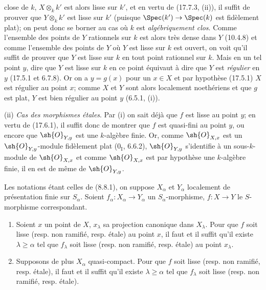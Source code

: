 
close de $k$, $X\otimes_k k'$ est alors lisse sur $k'$, et en vertu de (17.7.3, (ii)), il suffit de prouver que $Y\otimes_k k'$ est lisse sur $k'$ (puisque $\Spec(k')\to\Spec(k)$ est fidèlement plat); on peut donc se borner au cas où $k$ est \emph{algébriquement clos}. Comme l'ensemble des points de $Y$ rationnels sur $k$ est alors très dense dans $Y$ (10.4.8) et comme l'ensemble des points de $Y$ où $Y$ est lisse sur $k$ est ouvert, on voit qu'il suffit de prouver que $Y$ est lisse sur $k$ en tout point rationnel sur $k$. Mais en un tel point $y$, dire que $Y$ est lisse sur $k$ en ce point équivaut à dire que $Y$ est \emph{régulier} en $y$ (17.5.1 et 6.7.8). Or on a $y=g(x)$ pour un $x\in X$ et par hypothèse (17.5.1) $X$ est régulier au point $x$; comme $X$ et $Y$ sont alors localement noethériens et que $g$ est plat, $Y$ est bien régulier au point $y$ (6.5.1, (i)).

(ii) \emph{Cas des morphismes étales}. Par (i) on sait déjà que $f$ est lisse au point $y$; en vertu de (17.6.1), il suffit donc de montrer que $f$ est quasi-fini au point $y$, ou encore que $\sh{O}_{Y,y}$ est une $k$-algèbre finie. Or, comme $\sh{O}_{X,x}$ est un $\sh{O}_{Y,y}$-module fidèlement plat ($0_{\mathrm I}$, 6.6.2), $\sh{O}_{Y,y}$ s'identifie à un sous-$k$-module de $\sh{O}_{X,x}$ et comme $\sh{O}_{X,x}$ est par hypothèse une $k$-algèbre finie, il en est de même de $\sh{O}_{Y,y}$.

\begin{proposition}[17.7.8]
\label{IV.17.7.8}
Les notations étant celles de (8.8.1), on suppose $X_\alpha$ et $Y_\alpha$ localement de présentation finie sur $S_\alpha$. Soient $f_\alpha:X_\alpha\to Y_\alpha$ un $S_\alpha$-morphisme, $f:X\to Y$ le $S$-morphisme correspondant.
\begin{enumerate}
  \item[(i)] Soient $x$ un point de $X$, $x_\lambda$ sa projection canonique dans $X_\lambda$. Pour que $f$ soit lisse (resp. non ramifié, resp. étale) au point $x$, il faut et il suffit qu'il existe $\lambda\geq\alpha$ tel que $f_\lambda$ soit lisse (resp. non ramifié, resp. étale) au point $x_\lambda$.
  \item[(ii)] Supposons de plus $X_\alpha$ quasi-compact. Pour que $f$ soit lisse (resp. non ramifié, resp. étale), il faut et il suffit qu'il existe $\lambda\geq\alpha$ tel que $f_\lambda$ soit lisse (resp. non ramifié, resp. étale).
\end{enumerate}
\end{proposition}

